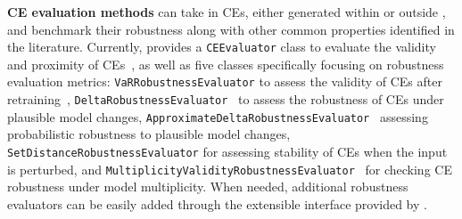 \textbf{CE evaluation methods} can take in CEs, either generated within or outside \name{}, and benchmark their robustness along with other common properties identified in the literature. Currently, \name{} provides a \texttt{CEEvaluator} class to evaluate the validity and proximity of CEs~\cite{Wachter17}, as well as five classes specifically focusing on robustness evaluation metrics:
\texttt{VaRRobustnessEvaluator} to assess the validity of CEs after retraining~\cite{DBLP:conf/icml/DuttaLMTM22}, \texttt{DeltaRobustnessEvaluator}~\cite{JiangL0T23} to assess the robustness of CEs under plausible model changes, \texttt{ApproximateDeltaRobustnessEvaluator}~\cite{DBLP:conf/ecai/MarzariLCF24} assessing probabilistic robustness to plausible model changes, \texttt{SetDistanceRobustnessEvaluator} \cite{LeofanteP24} for assessing stability of CEs when the input is perturbed, and \texttt{MultiplicityValidityRobustnessEvaluator}~\cite{DBLP:conf/kr/LeofanteBR23} for checking CE robustness under model multiplicity. When needed, additional robustness evaluators can be easily added through the extensible interface provided by \name{}.
 

